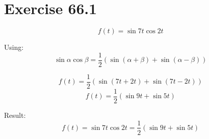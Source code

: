 \documentclass[a4paper, 10pt]{scrartcl}
\begin{document}
\section{Exercise 66.1}

\[f(t) = \sin{7t}\cos{2t}\]

Using:
\[\sin{\alpha}\cos{\beta} = \frac{1}{2}(\sin{(\alpha + \beta)} + \sin{(\alpha - \beta)})\]

\[f(t) = \frac{1}{2}(\sin{(7t + 2t)} + \sin{(7t - 2t)})\]
\[f(t) = \frac{1}{2}(\sin{9t} + \sin{5t})\]

Result:
\[f(t) = \sin{7t}\cos{2t} = \frac{1}{2}(\sin{9t} + \sin{5t})\]
\end{document}
